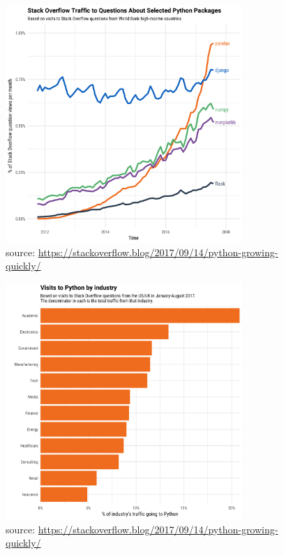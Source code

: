 \begin{frame}[c]
\begin{figure}[tb]
    \centering
    \includegraphics[width=0.8\textwidth, height=0.8\textheight]{material/fig-pandas-growth}
    \caption{source: \url{https://stackoverflow.blog/2017/09/14/python-growing-quickly/}}
    \label{fig:pandas-growth}
\end{figure}
\end{frame}

\begin{frame}[c]
\begin{figure}[tb]
    \centering
    \includegraphics[width=0.8\textwidth, height=0.8\textheight]{material/fig-pandas-visitors-by-industry}
    \caption{source: \url{https://stackoverflow.blog/2017/09/14/python-growing-quickly/}}
    \label{fig:figure1}
\end{figure}
\end{frame}

